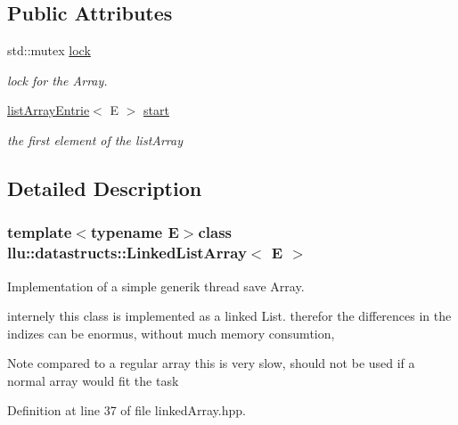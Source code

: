 \subsection*{Public Attributes}
\begin{DoxyCompactItemize}
\item 
std\+::mutex \hyperlink{classllu_1_1datastructs_1_1_linked_list_array_a7c9cdd61e7665e7f97447e25ca64451e}{lock}
\begin{DoxyCompactList}\small\item\em lock for the Array. \end{DoxyCompactList}\item 
\hyperlink{structllu_1_1datastructs_1_1list_array_entrie}{list\+Array\+Entrie}$<$ E $>$ \hyperlink{classllu_1_1datastructs_1_1_linked_list_array_ac6470a016e4ca99b16ab57db1b6f1f26}{start}
\begin{DoxyCompactList}\small\item\em the first element of the list\+Array \end{DoxyCompactList}\end{DoxyCompactItemize}


\subsection{Detailed Description}
\subsubsection*{template$<$typename E$>$class llu\+::datastructs\+::\+Linked\+List\+Array$<$ E $>$}

Implementation of a simple generik thread save Array. 

internely this class is implemented as a linked List. therefor the differences in the indizes can be enormus, without much memory consumtion, \begin{DoxyNote}{Note}
compared to a regular array this is very slow, should not be used if a normal array would fit the task 
\end{DoxyNote}


Definition at line 37 of file linked\+Array.\+hpp.



